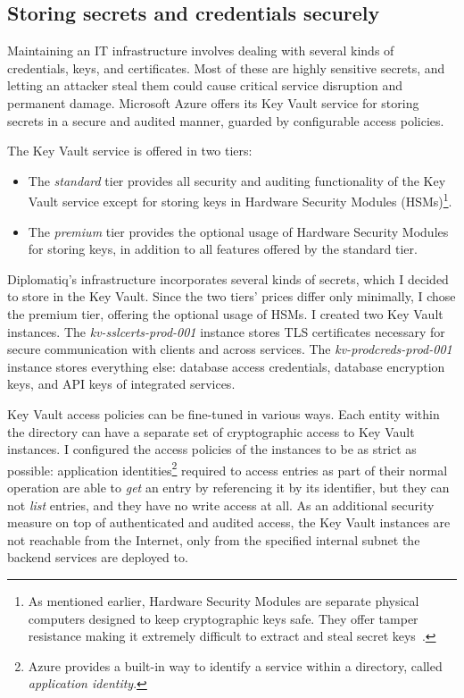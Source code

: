 \subsection{Storing secrets and credentials securely}

Maintaining an IT infrastructure involves dealing with several kinds of credentials, keys, and certificates. Most of these are highly sensitive secrets, and letting an attacker steal them could cause critical service disruption and permanent damage. Microsoft Azure offers its Key Vault service for storing secrets in a secure and audited manner, guarded by configurable access policies.

The Key Vault service is offered in two tiers:

\begin{itemize}
\item The \emph{standard} tier provides all security and auditing functionality of the Key Vault service except for storing keys in Hardware Security Modules (HSMs)\footnote{As mentioned earlier, Hardware Security Modules are separate physical computers designed to keep cryptographic keys safe. They offer tamper resistance making it extremely difficult to extract and steal secret keys~\cite{fips-140-3}.}.
\item The \emph{premium} tier provides the optional usage of Hardware Security Modules for storing keys, in addition to all features offered by the standard tier.
\end{itemize}

Diplomatiq's infrastructure incorporates several kinds of secrets, which I decided to store in the Key Vault. Since the two tiers' prices differ only minimally, I chose the premium tier, offering the optional usage of HSMs. I created two Key Vault instances. The \emph{kv-sslcerts-prod-001} instance stores TLS certificates necessary for secure communication with clients and across services. The \emph{kv-prodcreds-prod-001} instance stores everything else: database access credentials, database encryption keys, and API keys of integrated services.

Key Vault access policies can be fine-tuned in various ways. Each entity within the directory can have a separate set of cryptographic access to Key Vault instances. I configured the access policies of the instances to be as strict as possible: application identities\footnote{Azure provides a built-in way to identify a service within a directory, called \emph{application identity}.} required to access entries as part of their normal operation are able to \emph{get} an entry by referencing it by its identifier, but they can not \emph{list} entries, and they have no write access at all. As an additional security measure on top of authenticated and audited access, the Key Vault instances are not reachable from the Internet, only from the specified internal subnet the backend services are deployed to.

